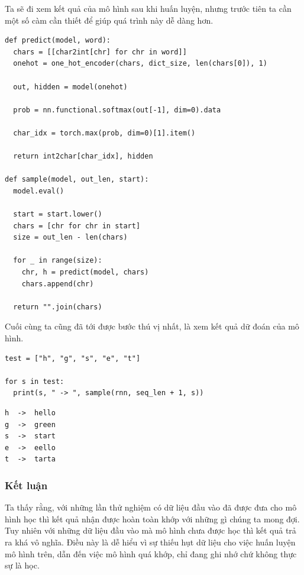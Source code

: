 \documentclass[a4paper]{article}
\begin{document}
Ta sẽ đi xem kết quả của mô hình sau khi huấn luyện, nhưng trước tiên ta cần một số càm cần thiết để giúp quá trình này dễ dàng hơn.
\begin{lstlisting}
def predict(model, word):
  chars = [[char2int[chr] for chr in word]]
  onehot = one_hot_encoder(chars, dict_size, len(chars[0]), 1)

  out, hidden = model(onehot)

  prob = nn.functional.softmax(out[-1], dim=0).data

  char_idx = torch.max(prob, dim=0)[1].item()

  return int2char[char_idx], hidden
  
def sample(model, out_len, start):
  model.eval()

  start = start.lower()
  chars = [chr for chr in start]
  size = out_len - len(chars)

  for _ in range(size):
    chr, h = predict(model, chars)
    chars.append(chr)

  return "".join(chars)
\end{lstlisting}
Cuối cùng ta cũng đã tới được bước thú vị nhất, là xem kết quả dữ đoán của mô hình.
\begin{lstlisting}
test = ["h", "g", "s", "e", "t"]

for s in test:
  print(s, " -> ", sample(rnn, seq_len + 1, s))
\end{lstlisting}
\begin{verbatim}
h  ->  hello
g  ->  green
s  ->  start
e  ->  eello
t  ->  tarta
\end{verbatim}

\subsubsection{Kết luận}
Ta thấy rằng, với những lần thử nghiệm có dữ liệu đầu vào đã được đưa cho mô hình học thì kết quả nhận được hoàn toàn khớp với những gì chúng ta mong đợi. Tuy nhiên với những dữ liệu đầu vào mà mô hình chưa được học thì kết quả trả ra khá vô nghĩa. Điều này là dễ hiểu vì sự thiếu hụt dữ liệu cho việc huấn luyện mô hình trên, dẫn đến việc mô hình quá khớp, chỉ đang ghi nhớ chứ không thực sự là học.

\newpage

\end{document}
